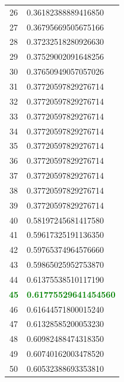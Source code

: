 \begin{table}[H]
\begin{minipage}{.5\linewidth}
\begin{tabular}{@{}cl@{}}
          26 & 0.36182388889416850 \\
          27 & 0.36795669505675166 \\ 
          28 & 0.37232518280926630 \\
          29 & 0.37529002091648256 \\
          30 & 0.37650949057057026 \\
          31 & 0.37720597829276714 \\
          32 & 0.37720597829276714 \\
          33 & 0.37720597829276714 \\
          34 & 0.37720597829276714 \\
          35 & 0.37720597829276714 \\
          36 & 0.37720597829276714 \\
          37 & 0.37720597829276714 \\
          38 & 0.37720597829276714 \\
          39 & 0.37720597829276714 \\
          40 & 0.58197245681417580 \\
          41 & 0.59617325191136350 \\
          42 & 0.59765374964576660 \\
          43 & 0.59865025952753870 \\
          44 & 0.61375538510117190 \\
          \textcolor{Green}{\textbf{45}} & \textcolor{Green}{\textbf{0.61775529641454560}} \\
          46 & 0.61644571800015240 \\
          47 & 0.61328585200053230 \\
          48 & 0.60982488474318350 \\
          49 & 0.60740162003478520 \\
          50 & 0.60532388693353810 \\ \bottomrule
      \end{tabular}
    \end{minipage}
\end{table}